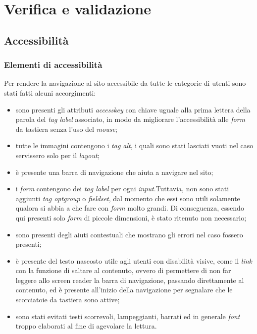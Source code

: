 
\chapter{Verifica e validazione}
\label{cap:verifica-validazione}

\section{Accessibilità}
\subsection{Elementi di accessibilità}
Per rendere la navigazione al sito accessibile da tutte le categorie di utenti
sono stati fatti alcuni accorgimenti:
\begin{itemize}
      \item sono presenti gli attributi \textit{accesskey} con chiave uguale
            alla
            prima lettera della parola del \textit{tag label} associato, in
            modo
            da
            migliorare l'accessibilità alle \textit{form} da tastiera senza
            l'uso
            del
            \textit{mouse};
      \item tutte le immagini contengono i \textit{tag alt}, i quali sono stati
            lasciati vuoti nel caso servissero solo per il \textit{layout};
      \item è presente una barra di navigazione che aiuta a navigare nel sito;
      \item i \textit{form} contengono dei \textit{tag label} per ogni
            \textit{input}.Tuttavia, non sono stati aggiunti \textit{tag
                  optgroup} o
            \textit{fieldset}, dal momento che essi sono utili solamente
            qualora si abbia a che fare con \textit{form}
            molto grandi.
            Di conseguenza, essendo qui presenti solo  \textit{form} di piccole
            dimensioni, è stato ritenuto non necessario;
      \item sono presenti degli aiuti contestuali che mostrano gli errori nel
            caso fossero presenti;
      \item è presente del testo nascosto utile agli utenti con disabilità
            visive, come il \textit{link} con la funzione  di saltare al
            contenuto, ovvero
            di permettere di non far leggere allo \gls{screen reader} la barra
            di
            navigazione, passando direttamente al contenuto, ed è presente
            all'inizio della
            navigazione per segnalare che le scorciatoie da tastiera sono
            attive;
      \item sono stati evitati testi scorrevoli, lampeggianti, barrati ed in
            generale \textit{font} troppo elaborati al fine di agevolare la
            lettura.
\end{itemize}

